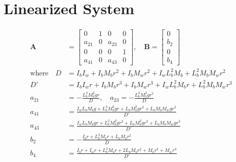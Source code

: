 \documentclass[12pt]{article}
\begin{document}
\section*{Linearized System}
\begin{align*}
\mathbf{A} &= 
\begin{bmatrix}
0 & 1 & 0 & 0 \\[8pt]
a_{21} & 0 & a_{23} & 0 \\[8pt]
0 & 0 & 0 & 1 \\[8pt]
a_{41} & 0 & a_{43} & 0
\end{bmatrix}, 
\quad 
\mathbf{B} = 
\begin{bmatrix}
0 \\[8pt]
b_2 \\[8pt]
0 \\[8pt]
b_4
\end{bmatrix} \\[12pt]
%
\text{where} \quad
D &= I_b I_w + I_b M_b r^2 + I_b M_w r^2 + I_w L_b^2 M_b + L_b^2 M_b M_w r^2 \\[6pt]
D' &= I_b I_w r + I_b M_b r^3 + I_b M_w r^3 + I_w L_b^2 M_b r + L_b^2 M_b M_w r^3 \\[12pt]
%
a_{21} &= -\frac{L_b^2 M_b^2 g r}{D}, 
\quad a_{23} = -\frac{L_b^2 M_b^2 g r^2}{D} \\[8pt]
%
a_{41} &= \frac{I_w L_b M_b g + L_b^2 M_b^2 g r + L_b M_b^2 g r^2 + L_b M_b M_w g r^2}{D'} \\[8pt]
%
a_{43} &= \frac{I_w L_b M_b g r + L_b^2 M_b^2 g r^2 + L_b M_b^2 g r^3 + L_b M_b M_w g r^3}{D'} \\[8pt]
%
b_2 &= -\frac{I_b r + L_b^2 M_b r + L_b M_b r^2}{D} \\[8pt]
%
b_4 &= \frac{
I_b r + I_w r + L_b^2 M_b r + 2 L_b M_b r^2 + M_b r^3 + M_w r^3
}{D'}
\end{align*}
  
\end{document}
